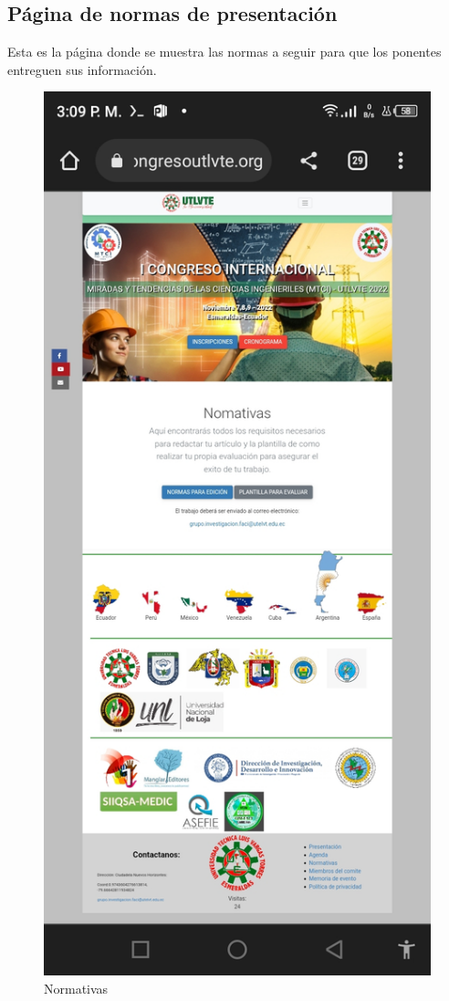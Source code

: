 \documentclass[a4paper,14px]{article}
\begin{document}
\newpage
\subsection{Página de normas de presentación }
\label{sec:pagina-principal}

Esta es la página  donde se muestra las normas a seguir para que los ponentes entreguen sus información.


\begin{minipage}[H]{0.45\linewidth}
  \begin{figure}[H]
    \centering
    \includegraphics[scale=0.3]{normativas.jpg}
    \caption{Normativas}
    \label{fig:arquitectura}
  \end{figure}

\end{minipage}
\newpage
\end{document}

